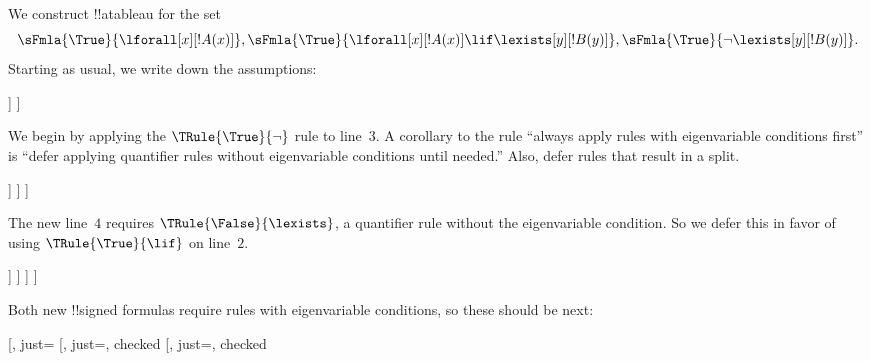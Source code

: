 \begin{ex}
We construct !!a{tableau} for the set
\[
\sFmla{\True}{\lforall[x][!A(x)]}, \sFmla{\True}{\lforall[x][!A(x)] 
  \lif \lexists[y][!B(y)]}, \sFmla{\True}{\lnot\lexists[y][!B(y)]}.
\]
Starting as usual, we write down the assumptions:
\begin{oltableau}
  [\sFmla{\True}{\lforall[x][\formula{A}(x)]}, just=\TAss
    [\sFmla{\True}{\lforall[x][\formula{A}(x)] \lif
        \lexists[y][\formula{B}(y)]}, just=\TAss
      [\sFmla{\True}{\lnot\lexists[y][\formula{B}(y)]}, just=\TAss
      ]
    ]
  ]
\end{oltableau}
We begin by applying the $\TRule{\True}{\lnot}$ rule to line~$3$. A
corollary to the rule ``always apply rules with eigenvariable
conditions first'' is ``defer applying quantifier rules without
eigenvariable conditions until needed.'' Also, defer rules that result
in a split.
\begin{oltableau}
  [\sFmla{\True}{\lforall[x][\formula{A}(x)]}, just=\TAss
    [\sFmla{\True}{\lforall[x][\formula{A}(x)] \lif
        \lexists[y][\formula{B}(y)]}, just=\TAss
      [\sFmla{\True}{\lnot\lexists[y][\formula{B}(y)]}, just=\TAss, checked
        [\sFmla{\False}{\lexists[y][\formula{B}(y)]}, just={\TRule{\True}{\lnot}[3]}]
      ]
    ]
  ]
\end{oltableau}
The new line~$4$ requires $\TRule{\False}{\lexists}$, a quantifier
rule without the eigenvariable condition. So we defer this in favor of
using $\TRule{\True}{\lif}$ on line~$2$.
\begin{oltableau}
  [\sFmla{\True}{\lforall[x][\formula{A}(x)]}, just=\TAss
    [\sFmla{\True}{\lforall[x][\formula{A}(x)] \lif
        \lexists[y][\formula{B}(y)]}, just=\TAss, checked
      [\sFmla{\True}{\lnot\lexists[y][\formula{B}(y)]}, just=\TAss, checked
        [\sFmla{\False}{\lexists[y][\formula{B}(y)]},
          just={\TRule{\True}{\lnot}[3]},
          [\sFmla{\False}{\lforall[x][\formula{A}(x)]}, just={\TRule{\True}{\lif}[2]}]
          [\sFmla{\True}{\lexists[y][\formula{B}(y)]}, just={\TRule{\True}{\lif}[2]}]
        ]
      ]
    ]
  ]
\end{oltableau}
Both new !!{signed formula}s require rules with eigenvariable conditions, so
these should be next:
\begin{oltableau}
  [\sFmla{\True}{\lforall[x][\formula{A}(x)]}, just=\TAss
    [\sFmla{\True}{\lforall[x][\formula{A}(x)] \lif
        \lexists[y][\formula{B}(y)]}, just=\TAss, checked
      [\sFmla{\True}{\lnot\lexists[y][\formula{B}(y)]}, just=\TAss, checked

\end{oltableau}
\end{ex}
